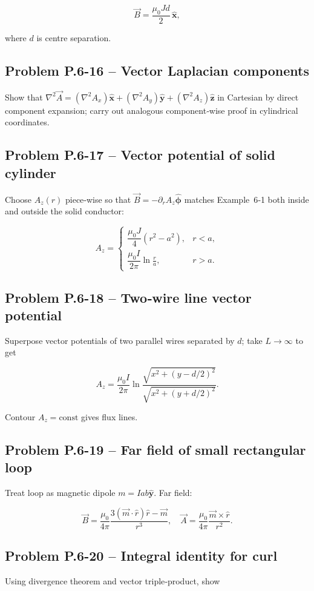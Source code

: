 \documentclass[12pt]{article}
\begin{document}
\[
\vec B=\frac{\mu_0 J d}{2}\,\hat{\mathbf x},
\]

where \(d\) is centre separation.
\n\bigskip\n\subsection*{Problem P.6-16 – Vector Laplacian components}\n
Show that \(\nabla^{2}\vec A=(\nabla^{2}A_x)\hat{\mathbf x}+(\nabla^{2}A_y)\hat{\mathbf y}+(\nabla^{2}A_z)\hat{\mathbf z}\) in Cartesian by direct component expansion; carry out analogous component‑wise proof in cylindrical coordinates.
\n\bigskip\n\subsection*{Problem P.6-17 – Vector potential of solid cylinder}\n
Choose \(A_z(r)\) piece‑wise so that \(\vec B=-\partial_r A_z\hat{\boldsymbol\phi}\) matches Example 6‑1 both inside and outside the solid conductor:

\[
A_z=
\begin{cases}
\dfrac{\mu_0 J}{4}(r^{2}-a^{2}),& r<a,\\[6pt]
\dfrac{\mu_0 I}{2\pi}\ln\frac{r}{a},& r>a.
\end{cases}
\]
\n\bigskip\n\subsection*{Problem P.6-18 – Two‑wire line vector potential}\n
Superpose vector potentials of two parallel wires separated by \(d\); take \(L\to\infty\) to get

\[
A_z=\frac{\mu_0 I}{2\pi}\ln\frac{\sqrt{x^{2}+(y-d/2)^{2}}}{\sqrt{x^{2}+(y+d/2)^{2}}}.
\]

Contour \(A_z=\text{const}\) gives flux lines.
\n\bigskip\n\subsection*{Problem P.6-19 – Far field of small rectangular loop}\n
Treat loop as magnetic dipole \(m=Iab\hat{\mathbf y}\).  Far field:

\[
\vec B=\frac{\mu_0}{4\pi}\frac{3(\vec m\cdot\hat r)\hat r-\vec m}{r^{3}},\quad
\vec A=\frac{\mu_0}{4\pi}\frac{\vec m\times\hat r}{r^{2}}.
\]
\n\bigskip\n\subsection*{Problem P.6-20 – Integral identity for curl}\n
Using divergence theorem and vector triple‑product, show
\end{document}
